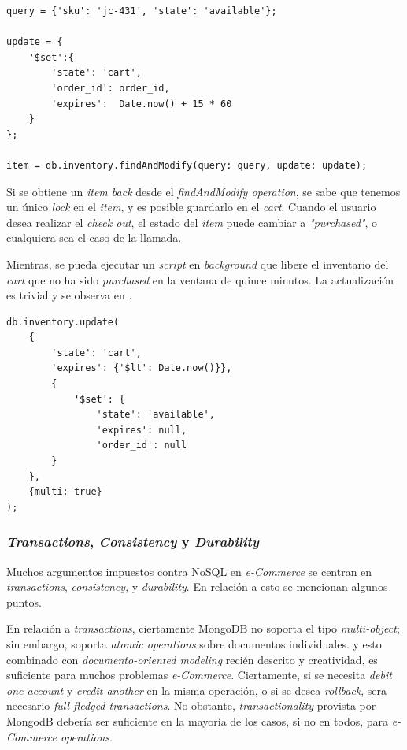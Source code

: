 \begin{lstlisting}[caption= Marcando un \textit{item} con tiempo de espiración., label=source:javascript:example_add_inventory_expiartion_mongodb]
query = {'sku': 'jc-431', 'state': 'available'};

update = {
	'$set':{
		'state': 'cart',
		'order_id': order_id,
		'expires':  Date.now() + 15 * 60
	}
};

item = db.inventory.findAndModify(query: query, update: update);
\end{lstlisting}

Si se obtiene un \textit{item back} desde el \textit{findAndModify operation}, se sabe que tenemos un único \textit{lock} en el \textit{item}, y es posible guardarlo en el \textit{cart}. Cuando el usuario desea realizar el \textit{check out}, el estado del \textit{item} puede cambiar a \textit{"purchased"}, o cualquiera sea el caso de la llamada.

Mientras, se pueda ejecutar un \textit{script} en \textit{background} que libere el inventario del \textit{cart} que no ha sido \textit{purchased} en la ventana de quince minutos. La actualización es trivial y se observa en .


\begin{lstlisting}[caption= Ejemplo de \textit{script} corriendo \textit{background}., label=source:javascript:example_add_script_background_mongodb]
db.inventory.update(
	{
		'state': 'cart',
		'expires': {'$lt': Date.now()}},
		{
			'$set': {
				'state': 'available',
				'expires': null,
				'order_id': null
		}
	},
	{multi: true}
);
\end{lstlisting} 

\subsubsection{\textit{Transactions}, \textit{Consistency} y \textit{Durability}}

Muchos argumentos impuestos contra NoSQL en \textit{e-Commerce} se centran en \textit{transactions}, \textit{consistency}, y \textit{durability}. En relación a esto se mencionan algunos puntos.

En relación a \textit{transactions}, ciertamente MongoDB no soporta el tipo \textit{multi-object}; sin embargo, soporta \textit{atomic operations} sobre documentos individuales. y esto combinado con \textit{documento-oriented modeling} recién descrito y creatividad, es suficiente para muchos problemas \textit{e-Commerce}. Ciertamente, si se necesita \textit{debit one account} y \textit{credit another} en la misma operación, o si se desea \textit{rollback}, sera necesario \textit{full-fledged transactions}. No obstante, \textit{transactionality} provista por MongodB debería ser suficiente en la mayoría de los casos, si no en todos, para \textit{e-Commerce operations}.

